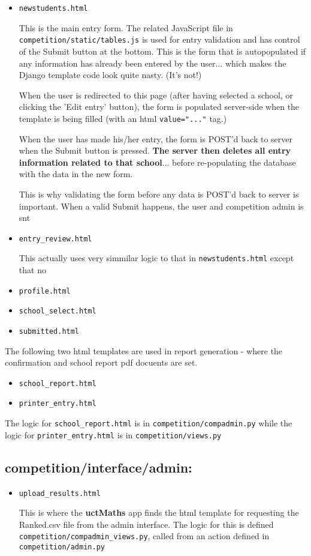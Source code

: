 \documentclass[a4paper,12pt]{article}
\begin{document}
\begin{itemize}
\item \verb|newstudents.html|

This is the main entry form. The related JavaScript file in \verb|competition/static/tables.js| is used for entry validation and has control of the Submit button at the bottom. This is the form that is autopopulated if any information has already been entered by the user... which makes the Django template code look quite nasty. (It's not!)

When the user is redirected to this page (after having selected a school, or clicking the 'Edit entry' button), the form is populated server-side when the template is being filled (with an html \verb|value="..."| tag.)

When the user has made his/her entry, the form is POST'd back to server when the Submit button is pressed. \textbf{The server then deletes all entry information related to that school}... before re-populating the database with the data in the new form.

This is why validating the form before any data is POST'd back to server is important. When a valid Submit happens, the user and competition admin is snt 


\item \verb|entry_review.html|

This actually uses very simmilar logic to that in \verb|newstudents.html| except that no 


\item \verb|profile.html|
\item \verb|school_select.html|
\item \verb|submitted.html|
\end{itemize}

The following two html templates are used in report generation - where the confirmation and school report pdf docuents are set. 

\begin{itemize}
\item \verb|school_report.html| 
\item \verb|printer_entry.html|
\end{itemize}

The logic for \verb|school_report.html| is in \verb|competition/compadmin.py| while the logic for \verb|printer_entry.html| is in \verb|competition/views.py|


\subsection{competition/interface/admin:}

\begin{itemize}
\item \verb|upload_results.html|

This is where the \textbf{uctMaths} app finds the html template for requesting the Ranked.csv file from the admin interface. The logic for this is defined \verb|competition/compadmin_views.py|, called from an action defined in \verb|competition/admin.py|

\end{itemize}
\end{document}
